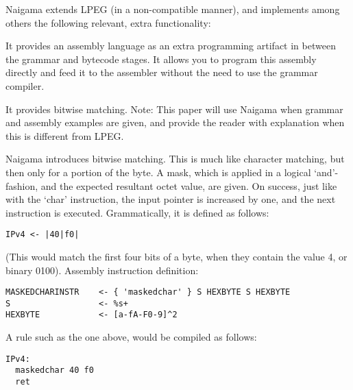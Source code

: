 Naigama extends LPEG (in a non-compatible manner), and implements among 
others the following relevant, extra functionality:
    \item It provides an assembly language as an extra programming artifact 
in between the grammar and bytecode stages. It allows you to program this 
assembly directly and feed it to the assembler without the need to use the 
grammar compiler.
    \item It provides bitwise matching.
Note: This paper will use Naigama when grammar and assembly examples are 
given, and provide the reader with explanation when this is different from 
LPEG.


Naigama introduces bitwise matching. This is much like character matching, 
but then only for a portion of the byte. A mask, which is applied in a 
logical ‘and’-fashion, and the expected resultant octet value, are 
given. On success, just like with the ‘char’ instruction, the input 
pointer is increased by one, and the next instruction is executed. 
Grammatically, it is defined as follows:

\begin{changemargin}{-60mm}{0mm}
\begin{myquote}
\begin{verbatim}
IPv4 <- |40|f0|
\end{verbatim}
\end{myquote}
\end{changemargin}

(This would match the first four bits of a byte, when they contain the 
value 4, or binary 0100).
Assembly instruction definition:

\begin{changemargin}{-60mm}{0mm}
\begin{myquote}
\begin{verbatim}
MASKEDCHARINSTR    <- { 'maskedchar' } S HEXBYTE S HEXBYTE
S                  <- %s+
HEXBYTE            <- [a-fA-F0-9]^2
\end{verbatim}
\end{myquote}
\end{changemargin}

A rule such as the one above, would be compiled as follows:

\begin{changemargin}{-60mm}{0mm}
\begin{myquote}
\begin{verbatim}
IPv4:
  maskedchar 40 f0
  ret
\end{verbatim}
\end{myquote}
\end{changemargin}

